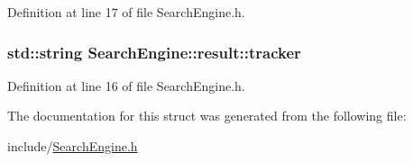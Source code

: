 Definition at line 17 of file SearchEngine.h.

\hypertarget{structSearchEngine_1_1result_a18de1c2bd486ec196e1599493c049e7f}{
\subsubsection[{tracker}]{\setlength{\rightskip}{0pt plus 5cm}std::string {\bf SearchEngine::result::tracker}}}
\label{structSearchEngine_1_1result_a18de1c2bd486ec196e1599493c049e7f}


Definition at line 16 of file SearchEngine.h.



The documentation for this struct was generated from the following file:\begin{DoxyCompactItemize}
\item 
include/\hyperlink{SearchEngine_8h}{SearchEngine.h}\end{DoxyCompactItemize}
